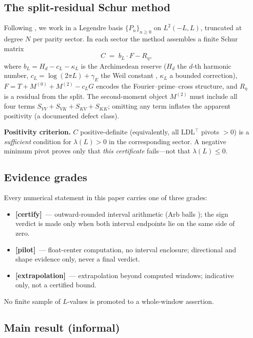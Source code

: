 \documentclass[12pt,a4paper]{amsart}
\theoremstyle{plain}
\theoremstyle{definition}
\newcommand{\cL}{c_L}
\newcommand{\bL}{b_L}
\newcommand{\certify}{\textbf{[certify]}}
\newcommand{\pilot}{\textbf{[pilot]}}
\newcommand{\extrap}{\textbf{[extrapolation]}}
\begin{document}
\subsection{The split-residual Schur method}

Following \cite{Tao2026WFP}, we work in a Legendre basis $\{P_n\}_{n \ge 0}$ on $L^2(-L,L)$, truncated
at degree $N$ per parity sector.  In each sector the method assembles a
finite Schur matrix
\[
  C \;=\; \bL \cdot F - R_\eta,
\]
where $\bL = H_d - \cL - \kappa_L$ is the Archimedean reserve ($H_d$ the
$d$-th harmonic number, $\cL = \log(2\pi L)+\gamma_E$ the Weil constant
\cite{Suzuki2026},
$\kappa_L$ a bounded correction), $F = T + M^{(0)} + M^{(2)} - \cL G$ encodes
the Fourier--prime--cross structure, and $R_\eta$ is a residual from the
split.  The second-moment object $M^{(2)}$ must include all four terms
$S_{VV}+S_{VK}+S_{KV}+S_{KK}$; omitting any term inflates the apparent
positivity (a documented defect class).

\textbf{Positivity criterion.}  $C$ positive-definite (equivalently, all
LDL$^\top$ pivots $> 0$) is a \emph{sufficient} condition for $\lambda(L) > 0$
in the corresponding sector.  A negative minimum pivot proves only that
\emph{this certificate} fails---not that $\lambda(L) \le 0$.

\subsection{Evidence grades}

Every numerical statement in this paper carries one of three grades:
\begin{itemize}[leftmargin=2em]
  \item \certify\ --- outward-rounded interval arithmetic (Arb balls
    \cite{Johansson2017}); the
    sign verdict is made only when both interval endpoints lie on the same
    side of zero.
  \item \pilot\ --- float-center computation, no interval enclosure;
    directional and shape evidence only, never a final verdict.
  \item \extrap\ --- extrapolation beyond computed windows; indicative
    only, not a certified bound.
\end{itemize}
No finite sample of $L$-values is promoted to a whole-window assertion.

\subsection{Main result (informal)}
\end{document}
